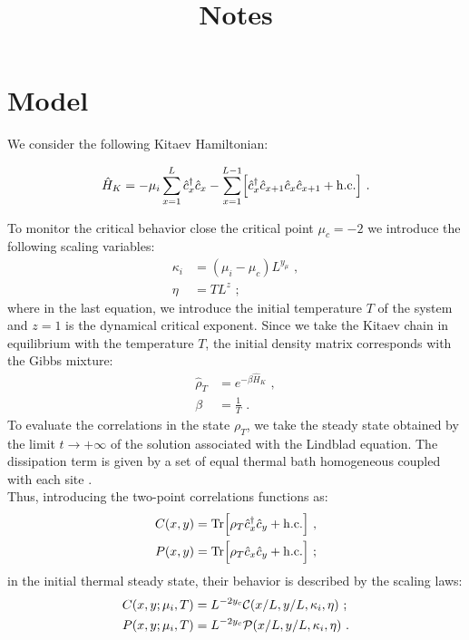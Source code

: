 \documentclass[pra,twocolumn,preprintnumbers,amsmath,amssymb,nofootinbib,floatfix,longbibliography]{revtex4}
\begin{document}
\title{Notes}

\author{}
\affiliation{}


\begin{abstract}
\end{abstract}
\maketitle

\section{Model}

We consider the following Kitaev Hamiltonian:

\begin{equation}
	\label{HKitaev}
	\hat H_K =-\mu_i \sum_{x=1}^L \hat c_x^\dagger \hat c_x
    -\sum _{x=1}^{L-1} \Bigr[\hat c_x^\dagger \hat c_{x+1}
	\hat c_x \hat c_{x+1} + {\rm h.c.} \Bigr]  \,\,.
\end{equation}

To monitor the critical behavior close the critical point
$\mu_c = -2$ we introduce the following scaling variables:
\begin{align}
	\label{scalvar}
	\kappa_i & = (\mu_i - \mu_c) L^{y_{\mu}} \,\,, \\
	\eta & = T L^{z} \,\,;
\end{align}
where in the last equation, we introduce the initial
temperature $T$ of the system and $z=1$ is the dynamical
critical exponent. Since we take the Kitaev chain in
equilibrium with the temperature $T$, the initial density
matrix corresponds with the Gibbs mixture:
\begin{align}
	\label{Gibbs}
	\hat \rho_T & = e^{-\beta \hat H_K} \,\,,\\
	\beta & = \frac{1}{T} \,\,.
\end{align}
To evaluate the correlations in the state $\rho_T$, we take
the steady state obtained by the limit $t \to +\infty$ of
the solution associated with the Lindblad equation.
The dissipation term is given by a set of equal thermal
bath homogeneous coupled with each site
\cite{P-2022-otto}.\\

Thus, introducing the two-point correlations functions as:
\begin{align}
  \label{corrs}
  C(x,y) &={\rm Tr}\Bigr[\rho_T\hat c^\dagger_x \hat c_y
						+  {\rm h.c.}\Bigr]\,\,,\\
  P(x,y) &={\rm Tr}\Bigr[\rho_T\hat c_x\hat c_y +
    {\rm h.c.}\Bigr] \,\,;
\end{align}
in the initial thermal steady state, their behavior is
described by the scaling laws:
\begin{align}
	\label{scalTcorr}
	C(x,y;\mu_i,T) &=L^{-2y_c} {\cal C}(x/L, y/L, \kappa_i,
    \eta) \,\,;\\
	P(x,y;\mu_i,T) &=L^{-2y_c} {\cal P}(x/L, y/L, \kappa_i,
                                     \eta) \,\,.
\end{align}
\end{document}
